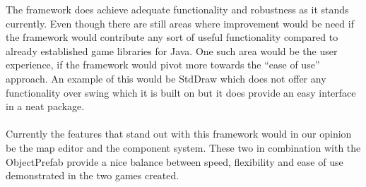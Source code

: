 \documentclass[main.tex]{subfiles}
\begin{document}
The framework does achieve adequate functionality and robustness as it stands currently. Even though there are still areas where improvement would be need if the framework would contribute any sort of useful functionality compared to already established game libraries for Java. One such area would be the user experience, if the framework would pivot more towards the “ease of use” approach. An example of this would be StdDraw which does not offer any functionality over swing which it is built on but it does provide an easy interface in a neat package.
\\ \\
Currently the features that stand out with this framework would in our opinion be the map editor and the component system. These two in combination with the ObjectPrefab provide a nice balance between speed, flexibility and ease of use demonstrated in the two games created. 
\end{document}
